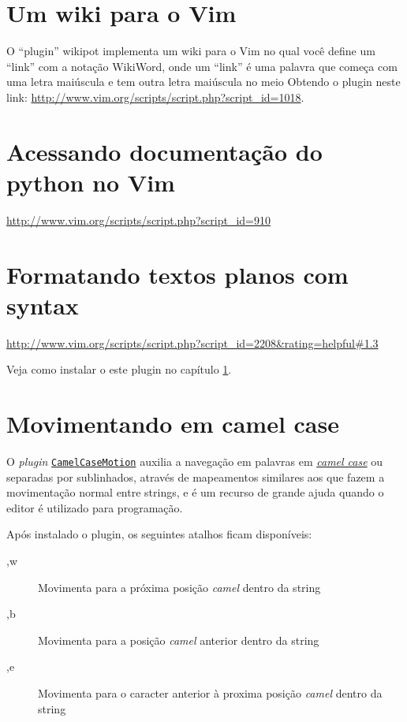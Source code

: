 \section{Um wiki para o Vim}
\label{sec:Um wiki para o Vim}

O ``plugin'' wikipot implementa um wiki para o Vim no qual você define
um ``link'' com a notação WikiWord, onde um ``link'' é uma palavra que
começa com uma letra maiúscula e tem outra letra maiúscula no meio
Obtendo o plugin neste link: \url{http://www.vim.org/scripts/script.php?script\_id=1018}.

\section{Acessando documentação do python no Vim}\label{Acessando documentação do python no Vim}

 \url{http://www.vim.org/scripts/script.php?script\_id=910}

\section{Formatando textos planos com syntax}
\label{Formatando textos planos com syntax}
\url{http://www.vim.org/scripts/script.php?script\_id=2208&rating=helpful#1.3}

Veja como instalar o este plugin no capítulo \ref{sec:Um wiki para o Vim}.

\section{Movimentando em camel case}
\label{Movimentando em camel case}

O {\em plugin} \href{http://www.vim.org/scripts/script.php?script_id=1905}{{\tt CamelCaseMotion}}
auxilia a navegação em palavras em \href{http://en.wikipedia.org/wiki/Camel_case}{{\em camel case}}
ou separadas por sublinhados, através de mapeamentos similares aos que fazem a movimentação normal entre 
strings, e é um recurso de grande ajuda quando o editor é utilizado para programação. 

Após instalado o plugin, os seguintes atalhos ficam disponíveis:
\begin{description}
 \item [,w] Movimenta para a próxima posição {\em camel} dentro da string
 \item [,b] Movimenta para a posição {\em camel} anterior dentro da string
 \item [,e] Movimenta para o caracter anterior à proxima posição {\em camel} dentro da string
\end{description}

